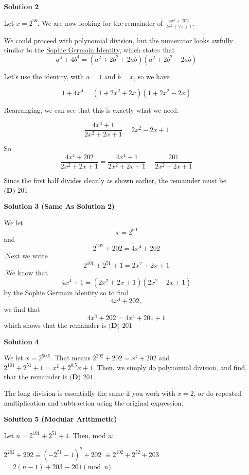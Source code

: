 \begin{enumerate}
 



\textbf{Solution 2}

Let $x=2^{50}$. We are now looking for the remainder of $\frac{4x^4+202}{2x^2+2x+1}$.

 We could proceed with polynomial division, but the numerator looks awfully similar to the \href{https://artofproblemsolving.com/wiki/index.php?title=Sophie\_Germain\_Identity}{Sophie Germain Identity},  which states that 
 \[a^4+4b^4=(a^2+2b^2+2ab)(a^2+2b^2-2ab)\]

 Let's use the identity, with $a=1$ and $b=x$, so we have

 
 \[1+4x^4=(1+2x^2+2x)(1+2x^2-2x)\]

 Rearranging, we can see that this is exactly what we need:

 
 \[\frac{4x^4+1}{2x^2+2x+1}=2x^2-2x+1\]

 So 
 \[\frac{4x^4+202}{2x^2+2x+1} = \frac{4x^4+1}{2x^2+2x+1} +\frac{201}{2x^2+2x+1}\]

 Since the first half divides cleanly as shown earlier, the remainder must be $\boxed{\textbf{(D) }201}$




\textbf{Solution 3 (Same As Solution 2)}

We let 
 \[x = 2^{50}\] and 
 \[2^{202} + 202 = 4x^{4} + 202\].Next we write 
 \[2^{101} + 2^{51} + 1 = 2x^{2} + 2x + 1\].We know that 
 \[4x^{4} + 1 = (2x^{2} + 2x + 1)(2x^{2} - 2x + 1)\] by the Sophie Germain identity so to find 
 \[4x^{4} + 202,\] we find that 
 \[4x^{4} + 202 = 4x^{4} + 201 + 1\] which shows that the remainder is $\boxed{\textbf{(D) } 201}$




\textbf{Solution 4}

We let $x=2^{50.5}$. That means $2^{202}+202=x^{4}+202$ and $2^{101}+2^{51}+1=x^{2}+2^{0.5}x+1$. Then, we simply do polynomial division, and find that the remainder is $\boxed{\textbf{(D) } 201}$.

 The long division is essentially the same if you work with $x=2$, or do repeated multiplication and subtraction using the original expression.

 



\textbf{Solution 5 (Modular Arithmetic)}

Let $n=2^{101}+2^{51}+1$. Then, mod $n$:

 $2^{202}+202 \equiv (-2^{51}-1)^2 + 202$
$\equiv 2^{102}+2^{52}+203$
$= 2(n-1)+203 \equiv 201 \pmod{n}$. 


\end{enumerate}

